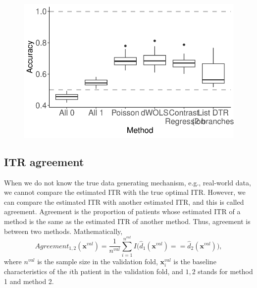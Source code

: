 \documentclass[
  letterpaper,
  DIV=11,
  numbers=noendperiod]{scrreprt}
\begin{document}
\begin{figure}[H]

{\centering \includegraphics{chapter_18_files/figure-pdf/accuracy-1.pdf}

}

\end{figure}

\hypertarget{itr-agreement}{%
\subsection{ITR agreement}\label{itr-agreement}}

When we do not know the true data generating mechanism, e.g., real-world
data, we cannot compare the estimated ITR with the true optimal ITR.
However, we can compare the estimated ITR with another estimated ITR,
and this is called agreement. Agreement is the proportion of patients
whose estimated ITR of a method is the same as the estimated ITR of
another method. Thus, agreement is between two methods. Mathematically,
\[Agreement_{1, 2}(\boldsymbol{x}^{val}) = \frac{1}{n^{val}} \sum_{i = 1}^{n^{val}} I\big( \hat{d}_{1}(\boldsymbol{x}^{val}) == \hat{d}_{2} (\boldsymbol{x}^{val}) \big), \]
where \(n^{val}\) is the sample size in the validation fold,
\(\boldsymbol{x}_i^{val}\) is the baseline characteristics of the
\(i\)th patient in the validation fold, and \(1, 2\) stands for method 1
and method 2.
\end{document}
